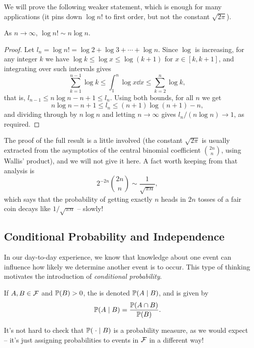 \documentclass[a4paper]{scrartcl}
\begin{document}
We will prove the following weaker statement, which is enough for many applications (it pins down $\log n!$ to first order, but not the constant $\sqrt{2\pi}$).

\begin{proposition}
	As $n \rightarrow \infty$, $\log n! \sim n \log n$.
\end{proposition}
\begin{proof}
	Let $l_n = \log n! = \log 2 + \log 3 + \cdots + \log n$. Since $\log$ is increasing, for any integer $k$ we have $\log k \leq \log x \leq \log(k+1)$ for $x \in [k, k+1]$, and integrating over such intervals gives
	$$
	\sum_{k = 1}^{n - 1} \log k \leq \int_1^n \log x \dd x \leq \sum_{k = 2}^{n} \log k,
	$$
	that is, $l_{n - 1} \leq n \log n - n + 1 \leq l_n$. Using both bounds, for all $n$ we get
	$$
	n \log n - n + 1 \leq l_n \leq (n + 1)\log (n + 1) - n,
	$$
	and dividing through by $n \log n$ and letting $n \rightarrow \infty$ gives $l_n / (n \log n) \rightarrow 1$, as required.
\end{proof}

The proof of the full result is a little involved (the constant $\sqrt{2\pi}$ is usually extracted from the asymptotics of the central binomial coefficient $\binom{2n}{n}$, using Wallis' product), and we will not give it here. A fact worth keeping from that analysis is
$$
2^{-2n}\binom{2n}{n} \sim \frac{1}{\sqrt{\pi n}},
$$
which says that the probability of getting exactly $n$ heads in $2n$ tosses of a fair coin decays like $1/\sqrt{\pi n}$ -- slowly!

\subsection{Conditional Probability and Independence}

In our day-to-day experience, we know that knowledge about one event can influence how likely we determine another event is to occur. This type of thinking motivates the introduction of \emph{conditional probability}.

\begin{definition}
	If $A, B \in \mathcal{F}$ and $\mathbb{P}(B) > 0$, the  is denoted $\mathbb{P}(A \mid B)$, and is given by
	$$
	\mathbb{P}(A \mid B) = \frac{\mathbb{P}(A \cap B)}{\mathbb{P}(B)}.
	$$
\end{definition}

It's not hard to check that $\mathbb{P}(\; \cdot \mid B)$ is a probability measure, as we would expect -- it's just assigning probabilities to events in $\mathcal{F}$ in a different way!
\end{document}
